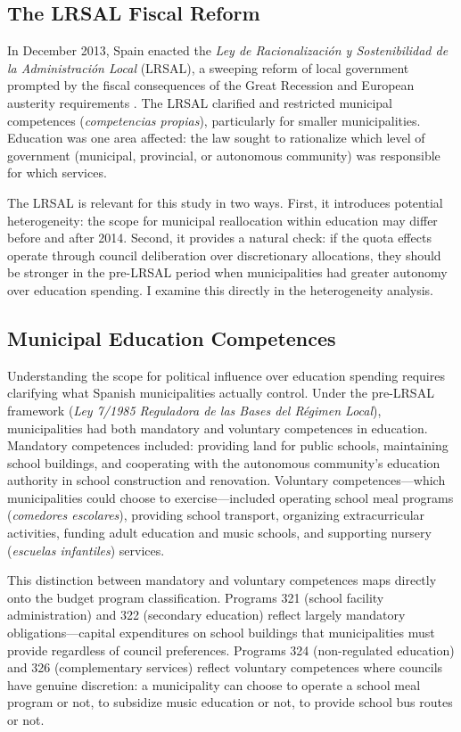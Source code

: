 \documentclass[12pt]{article}
\begin{document}
\subsection{The LRSAL Fiscal Reform}

In December 2013, Spain enacted the \emph{Ley de Racionalizaci\'{o}n y Sostenibilidad de la Administraci\'{o}n Local} (LRSAL), a sweeping reform of local government prompted by the fiscal consequences of the Great Recession and European austerity requirements \citep{lrsal2013}. The LRSAL clarified and restricted municipal competences (\emph{competencias propias}), particularly for smaller municipalities. Education was one area affected: the law sought to rationalize which level of government (municipal, provincial, or autonomous community) was responsible for which services.

The LRSAL is relevant for this study in two ways. First, it introduces potential heterogeneity: the scope for municipal reallocation within education may differ before and after 2014. Second, it provides a natural check: if the quota effects operate through council deliberation over discretionary allocations, they should be stronger in the pre-LRSAL period when municipalities had greater autonomy over education spending. I examine this directly in the heterogeneity analysis.

\subsection{Municipal Education Competences}

Understanding the scope for political influence over education spending requires clarifying what Spanish municipalities actually control. Under the pre-LRSAL framework (\emph{Ley 7/1985 Reguladora de las Bases del R\'{e}gimen Local}), municipalities had both mandatory and voluntary competences in education. Mandatory competences included: providing land for public schools, maintaining school buildings, and cooperating with the autonomous community's education authority in school construction and renovation. Voluntary competences---which municipalities could choose to exercise---included operating school meal programs (\emph{comedores escolares}), providing school transport, organizing extracurricular activities, funding adult education and music schools, and supporting nursery (\emph{escuelas infantiles}) services.

This distinction between mandatory and voluntary competences maps directly onto the budget program classification. Programs 321 (school facility administration) and 322 (secondary education) reflect largely mandatory obligations---capital expenditures on school buildings that municipalities must provide regardless of council preferences. Programs 324 (non-regulated education) and 326 (complementary services) reflect voluntary competences where councils have genuine discretion: a municipality can choose to operate a school meal program or not, to subsidize music education or not, to provide school bus routes or not.
\end{document}
